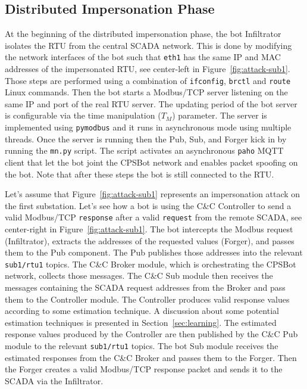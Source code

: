 \documentclass[sigconf]{acmart}
\makeatletter
\newcommand{\tcircle}[1]{\raisebox{.5pt}{\textcolor{SUTDred}{\textcircled{\raisebox{-.9pt} {#1}}}}}
\newcommand{\Botnet}{CPSBot\@\xspace}
\newcommand{\CC}{C\&C\@\xspace}
\makeatother
\begin{document}


\subsection{Distributed Impersonation Phase}
\label{sec:impersonation}

At the beginning of the distributed impersonation phase, the bot Infiltrator
isolates the RTU from the central SCADA network. This is done by modifying
the network interfaces of the bot such that \texttt{eth1} has the same IP and
MAC addresses of the impersonated RTU, see center-left \tcircle{2} in
Figure~\ref{fig:attack-sub1}. Those steps are performed using a combination
of \texttt{ifconfig}, \texttt{brctl} and \texttt{route} Linux commands.
Then the bot starts a Modbus/TCP
server listening on the same IP and port of the real RTU server. The updating
period of the bot server is configurable via the time manipulation ($T_M$)
parameter. The server is implemented using
\texttt{pymodbus} and it runs in asynchronous mode using multiple threads. Once the
server is running then the Pub, Sub, and Forger kick in by running the
\texttt{mn.py} script. The script activates an asynchronous \texttt{paho} MQTT
client that let the bot joint the \Botnet network and enables packet spoofing on
the bot. Note that after these steps the bot is still connected to the RTU.

Let's assume that Figure~\ref{fig:attack-sub1} represents an impersonation
attack on the first substation. Let's see how a bot is using the
\CC Controller to send a valid Modbus/TCP \texttt{response} after a valid
\texttt{request} from the remote SCADA, see center-right \tcircle{2} in
Figure~\ref{fig:attack-sub1}. The bot intercepts the Modbus request
(Infiltrator), extracts the addresses of the requested values (Forger),
and passes them to the Pub component. The Pub publishes those addresses into the
relevant \texttt{sub1/rtu1} topics. The \CC Broker
module, which is orchestrating the \Botnet network, collects those messages. The \CC
Sub module then receives the messages containing the SCADA request addresses
from the Broker and pass them to the Controller module. The Controller
produces valid response values according to some estimation technique. A
discussion about some potential estimation techniques is presented in
Section~\ref{sec:learning}. The estimated response values produced by the
Controller are then
published by the \CC Pub module to the relevant \texttt{sub1/rtu1} topics. The
bot Sub module receives the estimated responses from the
\CC Broker and passes them to the Forger. Then the Forger creates
a valid Modbus/TCP response packet and sends it to the SCADA via the
Infiltrator.
\end{document}
